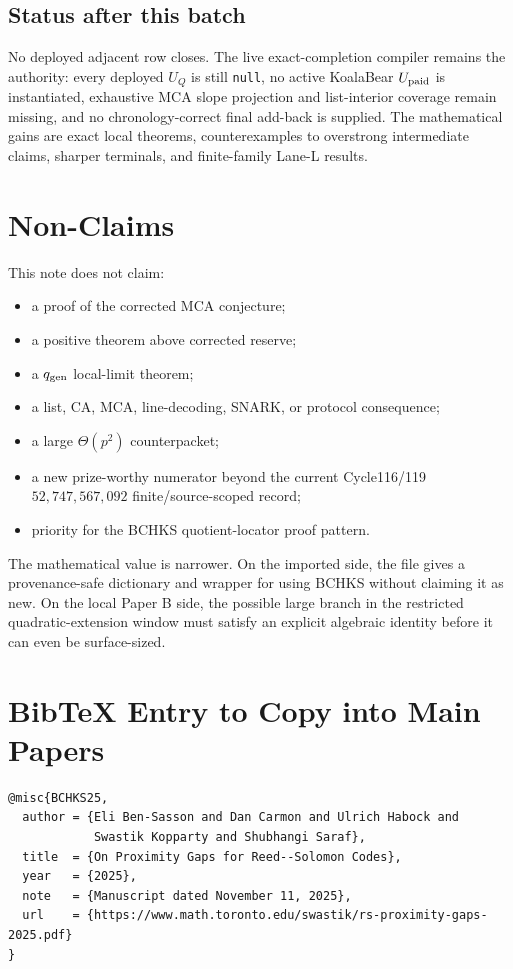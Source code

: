 \documentclass[11pt]{article}
\newcommand{\qgen}{q_{\rm gen}}
\begin{document}
\subsection{Status after this batch}

No deployed adjacent row closes.  The live exact-completion compiler remains
the authority: every deployed \(U_Q\) is still \texttt{null}, no active
KoalaBear \(U_{\rm paid}\) is instantiated, exhaustive MCA slope projection
and list-interior coverage remain missing, and no chronology-correct final
add-back is supplied.  The mathematical gains are exact local theorems,
counterexamples to overstrong intermediate claims, sharper terminals, and
finite-family Lane-L results.

\section{Non-Claims}
\label{sec:nonclaims}

This note does not claim:
\begin{itemize}
\item a proof of the corrected MCA conjecture;
\item a positive theorem above corrected reserve;
\item a \(\qgen\) local-limit theorem;
\item a list, CA, MCA, line-decoding, SNARK, or protocol consequence;
\item a large \(\Theta(p^2)\) counterpacket;
\item a new prize-worthy numerator beyond the current Cycle116/119
  \(52{,}747{,}567{,}092\) finite/source-scoped record;
\item priority for the BCHKS quotient-locator proof pattern.
\end{itemize}

The mathematical value is narrower.  On the imported side, the file gives a
provenance-safe dictionary and wrapper for using BCHKS without claiming it as
new.  On the local Paper B side, the possible large branch in the restricted
quadratic-extension window must satisfy an explicit algebraic identity before
it can even be surface-sized.

\appendix

\section{BibTeX Entry to Copy into Main Papers}

\begin{verbatim}
@misc{BCHKS25,
  author = {Eli Ben-Sasson and Dan Carmon and Ulrich Habock and
            Swastik Kopparty and Shubhangi Saraf},
  title  = {On Proximity Gaps for Reed--Solomon Codes},
  year   = {2025},
  note   = {Manuscript dated November 11, 2025},
  url    = {https://www.math.toronto.edu/swastik/rs-proximity-gaps-2025.pdf}
}
\end{verbatim}
\end{document}
